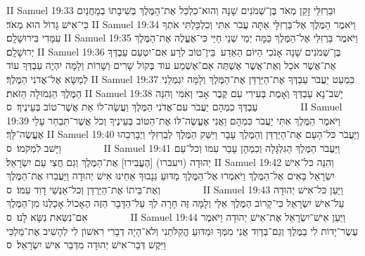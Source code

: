 II Samuel 19:33	וּבַרְזִלַּי זָקֵן מְאֹד בֶּן־שְׁמֹנִים שָׁנָה וְהוּא־כִלְכַּל אֶת־הַמֶּלֶךְ בְּשִׁיבָתוֹ בְמַחֲנַיִם כִּי־אִישׁ גָּדוֹל הוּא מְאֹד׃
II Samuel 19:34	וַיֹּאמֶר הַמֶּלֶךְ אֶל־בַּרְזִלָּי אַתָּה עֲבֹר אִתִּי וְכִלְכַּלְתִּי אֹתְךָ עִמָּדִי בִּירוּשָׁלָ͏ִם׃
II Samuel 19:35	וַיֹּאמֶר בַּרְזִלַּי אֶל־הַמֶּלֶךְ כַּמָּה יְמֵי שְׁנֵי חַיַּי כִּי־אֶעֱלֶה אֶת־הַמֶּלֶךְ יְרוּשָׁלָ͏ִם׃
II Samuel 19:36	בֶּן־שְׁמֹנִים שָׁנָה אָנֹכִי הַיּוֹם הַאֵדַע  בֵּין־טוֹב לְרָע אִם־יִטְעַם עַבְדְּךָ אֶת־אֲשֶׁר אֹכַל וְאֶת־אֲשֶׁר אֶשְׁתֶּה אִם־אֶשְׁמַע עוֹד בְּקוֹל שָׁרִים וְשָׁרוֹת וְלָמָּה יִהְיֶה עַבְדְּךָ עוֹד לְמַשָּׂא אֶל־אֲדֹנִי הַמֶּלֶךְ׃
II Samuel 19:37	כִּמְעַט יַעֲבֹר עַבְדְּךָ אֶת־הַיַּרְדֵּן אֶת־הַמֶּלֶךְ וְלָמָּה יִגְמְלֵנִי הַמֶּלֶךְ הַגְּמוּלָה הַזֹּאת׃
II Samuel 19:38	יָשׁב־נָא עַבְדְּךָ וְאָמֻת בְּעִירִי עִם קֶבֶר אָבִי וְאִמִּי וְהִנֵּה  עַבְדְּךָ כִמְהָם יַעֲבֹר עִם־אֲדֹנִי הַמֶּלֶךְ וַעֲשֵׂה־לוֹ אֵת אֲשֶׁר־טוֹב בְּעֵינֶיךָ׃ {ס}        
II Samuel 19:39	וַיֹּאמֶר הַמֶּלֶךְ אִתִּי יַעֲבֹר כִּמְהָם וַאֲנִי אֶעֱשֶׂה־לּוֹ אֶת־הַטּוֹב בְּעֵינֶיךָ וְכֹל אֲשֶׁר־תִּבְחַר עָלַי אֶעֱשֶׂה־לָּךְ׃
II Samuel 19:40	וַיַּעֲבֹר כּל־הָעָם אֶת־הַיַּרְדֵּן וְהַמֶּלֶךְ עָבָר וַיִּשַּׁק הַמֶּלֶךְ לְבַרְזִלַּי וַיְבָרְכֵהוּ וַיָּשׁב לִמְקֹמוֹ׃ {ס}        
II Samuel 19:41	וַיַּעֲבֹר הַמֶּלֶךְ הַגִּלְגָּלָה וְכִמְהָן עָבַר עִמּוֹ וְכל־עַם יְהוּדָה (ויעברו) [הֶעֱבִירוּ] אֶת־הַמֶּלֶךְ וְגַם חֲצִי עַם יִשְׂרָאֵל׃
II Samuel 19:42	וְהִנֵּה כּל־אִישׁ יִשְׂרָאֵל בָּאִים אֶל־הַמֶּלֶךְ וַיֹּאמְרוּ אֶל־הַמֶּלֶךְ מַדּוּעַ גְּנָבוּךָ אַחֵינוּ אִישׁ יְהוּדָה וַיַּעֲבִרוּ אֶת־הַמֶּלֶךְ וְאֶת־בֵּיתוֹ אֶת־הַיַּרְדֵּן וְכל־אַנְשֵׁי דָוִד עִמּוֹ׃ {ס}        
II Samuel 19:43	וַיַּעַן כּל־אִישׁ יְהוּדָה עַל־אִישׁ יִשְׂרָאֵל כִּי־קָרוֹב הַמֶּלֶךְ אֵלַי וְלָמָּה זֶּה חָרָה לְךָ עַל־הַדָּבָר הַזֶּה הֶאָכוֹל אָכַלְנוּ מִן־הַמֶּלֶךְ אִם־נִשֵּׂאת נִשָּׂא לָנוּ׃ {ס}        
II Samuel 19:44	וַיַּעַן אִישׁ־יִשְׂרָאֵל אֶת־אִישׁ יְהוּדָה וַיֹּאמֶר עֶשֶׂר־יָדוֹת לִי בַמֶּלֶךְ וְגַם־בְּדָוִד אֲנִי מִמְּךָ וּמַדּוּעַ הֱקִלֹּתַנִי וְלֹא־הָיָה דְבָרִי רִאשׁוֹן לִי לְהָשִׁיב אֶת־מַלְכִּי וַיִּקֶשׁ דְּבַר־אִישׁ יְהוּדָה מִדְּבַר אִישׁ יִשְׂרָאֵל׃ {ס}        
